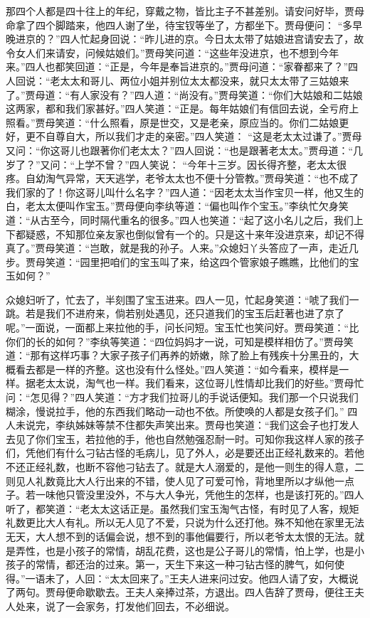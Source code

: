 \begin{parag}


    那四个人都是四十往上的年纪，穿戴之物，皆比主子不甚差别。请安问好毕，贾母命拿了四个脚踏来，他四人谢了坐，待宝钗等坐了，方都坐下。贾母便问： “多早晚进京的？”四人忙起身回说：“昨儿进的京。今日太太带了姑娘进宫请安去了，故令女人们来请安，问候姑娘们。”贾母笑问道：“这些年没进京，也不想到今年来。”四人也都笑回道：“正是，今年是奉旨进京的。”贾母问道：“家眷都来了？”四人回说：“老太太和哥儿、两位小姐并别位太太都没来，就只太太带了三姑娘来了。”贾母道：“有人家没有？”四人道：“尚没有。”贾母笑道：“你们大姑娘和二姑娘这两家，都和我们家甚好。”四人笑道：“正是。每年姑娘们有信回去说，全亏府上照看。”贾母笑道：“什么照看，原是世交，又是老亲，原应当的。你们二姑娘更好，更不自尊自大，所以我们才走的亲密。”四人笑道： “这是老太太过谦了。”贾母又问：“你这哥儿也跟著你们老太太？”四人回说：“也是跟著老太太。”贾母道：“几岁了？”又问：“上学不曾？”四人笑说： “今年十三岁。因长得齐整，老太太很疼。自幼淘气异常，天天逃学，老爷太太也不便十分管教。”贾母笑道：“也不成了我们家的了！你这哥儿叫什么名字？”四人道：“因老太太当作宝贝一样，他又生的白，老太太便叫作宝玉。”贾母便向李纨等道：“偏也叫作个宝玉。”李纨忙欠身笑道：“从古至今，同时隔代重名的很多。”四人也笑道：“起了这小名儿之后，我们上下都疑惑，不知那位亲友家也倒似曾有一个的。只是这十来年没进京来，却记不得真了。”贾母笑道：“岂敢，就是我的孙子。人来。”众媳妇丫头答应了一声，走近几步。贾母笑道：“园里把咱们的宝玉叫了来，给这四个管家娘子瞧瞧，比他们的宝玉如何？”
\end{parag}


\begin{parag}


    众媳妇听了，忙去了，半刻围了宝玉进来。四人一见，忙起身笑道：“唬了我们一跳。若是我们不进府来，倘若别处遇见，还只道我们的宝玉后赶著也进了京了呢。”一面说，一面都上来拉他的手，问长问短。宝玉忙也笑问好。贾母笑道：“比你们的长的如何？”李纨等笑道：“四位妈妈才一说，可知是模样相仿了。”贾母笑道：“那有这样巧事？大家子孩子们再养的娇嫩，除了脸上有残疾十分黑丑的，大概看去都是一样的齐整。这也没有什么怪处。”四人笑道：“如今看来，模样是一样。据老太太说，淘气也一样。我们看来，这位哥儿性情却比我们的好些。”贾母忙问：“怎见得？”四人笑道：“方才我们拉哥儿的手说话便知。我们那一个只说我们糊涂，慢说拉手，他的东西我们略动一动也不依。所使唤的人都是女孩子们。” 四人未说完，李纨姊妹等禁不住都失声笑出来。贾母也笑道：“我们这会子也打发人去见了你们宝玉，若拉他的手，他也自然勉强忍耐一时。可知你我这样人家的孩子们，凭他们有什么刁钻古怪的毛病儿，见了外人，必是要还出正经礼数来的。若他不还正经礼数，也断不容他刁钻去了。就是大人溺爱的，是他一则生的得人意，二则见人礼数竟比大人行出来的不错，使人见了可爱可怜，背地里所以才纵他一点子。若一味他只管没里没外，不与大人争光，凭他生的怎样，也是该打死的。”四人听了，都笑道：“老太太这话正是。虽然我们宝玉淘气古怪，有时见了人客，规矩礼数更比大人有礼。所以无人见了不爱，只说为什么还打他。殊不知他在家里无法无天，大人想不到的话偏会说，想不到的事他偏要行，所以老爷太太恨的无法。就是弄性，也是小孩子的常情，胡乱花费，这也是公子哥儿的常情，怕上学，也是小孩子的常情，都还治的过来。第一，天生下来这一种刁钻古怪的脾气，如何使得。”一语未了，人回：“太太回来了。”王夫人进来问过安。他四人请了安，大概说了两句。贾母便命歇歇去。王夫人亲捧过茶，方退出。四人告辞了贾母，便往王夫人处来，说了一会家务，打发他们回去，不必细说。
\end{parag}


